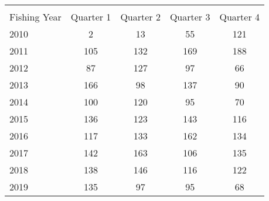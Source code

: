 {
\def\sym#1{\ifmmode^{#1}\else\(^{#1}\)\fi}
\begin{tabular}{l*{4}{c}}
\hline\hline
            &\multicolumn{4}{c}{}                               \\
Fishing Year&   Quarter 1&   Quarter 2&   Quarter 3&   Quarter 4\\
\hline
2010        &           2&          13&          55&         121\\
2011        &         105&         132&         169&         188\\
2012        &          87&         127&          97&          66\\
2013        &         166&          98&         137&          90\\
2014        &         100&         120&          95&          70\\
2015        &         136&         123&         143&         116\\
2016        &         117&         133&         162&         134\\
2017        &         142&         163&         106&         135\\
2018        &         138&         146&         116&         122\\
2019        &         135&          97&          95&          68\\
\hline\hline
\end{tabular}
}
